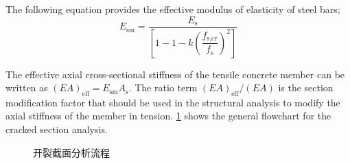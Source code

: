 The following equation provides the effective modulus of elasticity of steel bars;
\begin{equation}
  E_\text{sm} = \frac{E_\text{s}}{\left[1- 1-k \left( \dfrac{f_\text{s,cr}}{f_\text{s}}\right)^2 \right]}
\end{equation}

The effective axial cross-sectional stiffness of the tensile concrete member can be written as $(EA)_\text{eff}= E_\text{sm} A_\text{s}$. The ratio term $(EA)_\text{eff}/(EA)$ is the section modification factor that should be used in the structural analysis to modify the axial stiffness of the member in tension. \cref{fig:cracked-section-analysis} shows the general flowchart for the cracked section analysis.

\begin{figure}
  \caption{开裂截面分析流程}
  \label{fig:cracked-section-analysis}
\end{figure}